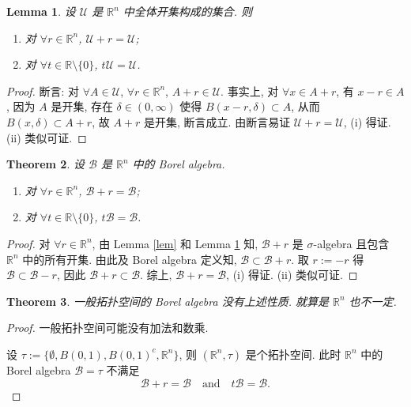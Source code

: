 \documentclass[a4paper,11pt]{article}
\newtheorem{theorem}{Theorem}[section]
\newtheorem{lemma}[theorem]{Lemma}
\theoremstyle{definition}
\begin{document}
\begin{CJK*}{UTF8}{gbsn}
\begin{lemma} \label{lem2}
    设 $ \mathcal{U} $ 是 $ \mathbb{R}^n $ 中全体开集构成的集合. 则
    \begin{enumerate}[{\rm (i)}]
        \item 对 $ \forall r \in \mathbb{R}^n $, $ \mathcal{U} + r = \mathcal{U} $;
        \item 对 $ \forall t \in \mathbb{R} \setminus \{0\} $, $ t \mathcal{U} = \mathcal{U} $.
    \end{enumerate}
\end{lemma}

\begin{proof}
    断言: 对 $ \forall A \in \mathcal{U} $, $ \forall r \in \mathbb{R}^n $, $ A + r \in \mathcal{U} $.
    事实上, 对 $ \forall x \in A + r $, 有 $ x - r \in A $, 因为 $ A $ 是开集, 存在 $ \delta \in (0, \infty) $
    使得 $ B(x - r, \delta) \subset A $, 从而 $ B(x, \delta) \subset A + r $, 故 $ A + r $ 是开集, 断言成立.
    由断言易证 $ \mathcal{U} + r = \mathcal{U} $, (i) 得证. 
    (ii) 类似可证.
\end{proof}

\begin{theorem} \label{thm1}
    设 $ \mathscr{B} $ 是 $ \mathbb{R}^n $ 中的 Borel algebra.
    \begin{enumerate}[{\rm (i)}]
        \item 对 $ \forall r \in \mathbb{R}^n $, $ \mathscr{B} + r = \mathscr{B} $;
        \item 对 $ \forall t \in \mathbb{R} \setminus \{0\} $, $ t \mathscr{B} = \mathscr{B} $.
    \end{enumerate}
\end{theorem}

\begin{proof}
    对 $ \forall r \in \mathbb{R}^n $, 由 Lemma \ref{lem} 和 Lemma \ref{lem2}  知, 
    $ \mathscr{B} + r $ 是 $ \sigma $-algebra 且包含 $ \mathbb{R}^n $ 中的所有开集.
    由此及 Borel algebra 定义知, $ \mathscr{B} \subset \mathscr{B} + r $.
    取 $ r := -r $ 得 $ \mathscr{B} \subset \mathscr{B} - r $,
    因此 $ \mathscr{B} + r \subset \mathscr{B} $.
    综上, $ \mathscr{B} + r = \mathscr{B} $, (i) 得证. 
    (ii) 类似可证.
\end{proof}

\begin{theorem} \label{thm2}
    一般拓扑空间的 Borel algebra 没有上述性质. 就算是 $ \mathbb{R}^n $ 也不一定.
\end{theorem}

\begin{proof}
    一般拓扑空间可能没有加法和数乘.
    
    设 $ \tau := \{ \emptyset, B(0,1), B(0,1)^c, \mathbb{R}^n \} $, 则 $ (\mathbb{R}^n, \tau) $ 是个拓扑空间.
    此时 $ \mathbb{R}^n $ 中的 Borel algebra $ \mathscr{B} = \tau $ 不满足 
    $$ 
        \mathscr{B} + r = \mathscr{B} 
            \quad \text{and} \quad 
        t \mathscr{B} = \mathscr{B}.
    $$
\end{proof}

\end{CJK*}
\end{document}
